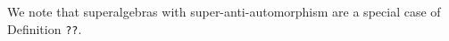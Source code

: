  
We note that superalgebras with super-anti-automorphism are a special case of Definition {\tt ??}. 

    
    
    
    

    


